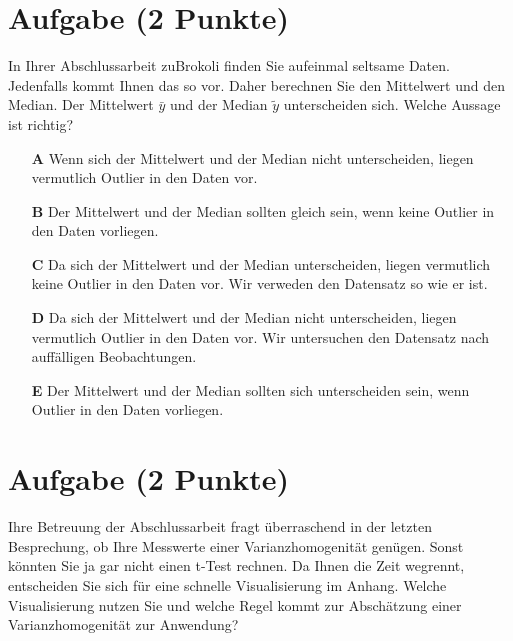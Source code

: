 \documentclass[a4paper, 9pt]{scrartcl}\usepackage[]{graphicx}\usepackage[]{xcolor}
\begin{document}
\section{Aufgabe \hfill (2 Punkte)}



In Ihrer Abschlussarbeit zuBrokoli finden Sie aufeinmal seltsame Daten. Jedenfalls kommt Ihnen das so vor. Daher berechnen Sie den Mittelwert und den Median. Der Mittelwert $\bar{y}$ und der Median $\tilde{y}$ unterscheiden sich. Welche Aussage ist richtig?



\begin{enumerate}
\item [\textbf{A} \msquare] Wenn sich der Mittelwert und der Median nicht unterscheiden, liegen vermutlich Outlier in den Daten vor.
\item [\textbf{B} \msquare] Der Mittelwert und der Median sollten gleich sein, wenn keine Outlier in den Daten vorliegen. 
\item [\textbf{C} \msquare] Da sich der Mittelwert und der Median unterscheiden, liegen vermutlich keine Outlier in den Daten vor. Wir verweden den Datensatz so wie er ist.
\item [\textbf{D} \msquare] Da sich der Mittelwert und der Median nicht unterscheiden, liegen vermutlich Outlier in den Daten vor. Wir untersuchen den Datensatz nach auffälligen Beobachtungen.
\item [\textbf{E} \msquare] Der Mittelwert und der Median sollten sich unterscheiden sein, wenn Outlier in den Daten vorliegen. 
\end{enumerate}

\section{Aufgabe \hfill (2 Punkte)}



Ihre Betreuung der Abschlussarbeit fragt überraschend in der letzten Besprechung, ob Ihre Messwerte einer Varianzhomogenität genügen. Sonst könnten Sie ja gar nicht einen t-Test rechnen. Da Ihnen die Zeit wegrennt, entscheiden Sie sich für eine schnelle Visualisierung im Anhang. Welche Visualisierung nutzen Sie und welche Regel kommt zur Abschätzung einer Varianzhomogenität zur Anwendung?
\end{document}
